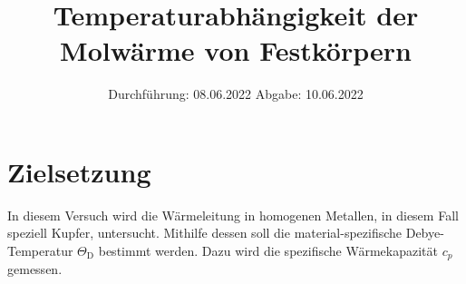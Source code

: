 

\subject{V47}
\title{Temperaturabhängigkeit der Molwärme von Festkörpern}
\date{
    Durchführung: 08.06.2022
     \hspace{3em}
    Abgabe: 10.06.2022
}


\maketitle
\thispagestyle{empty}
\tableofcontents
\newpage

\section{Zielsetzung}

    In diesem Versuch wird die Wärmeleitung in homogenen Metallen,
    in diesem Fall speziell Kupfer,
    untersucht.
    Mithilfe dessen soll die material-spezifische Debye-Temperatur $\Theta_\text{D}$ bestimmt werden.
    Dazu wird die spezifische Wärmekapazität $c_p$ gemessen.


\clearpage


\clearpage


\clearpage


\clearpage

\printbibliography


